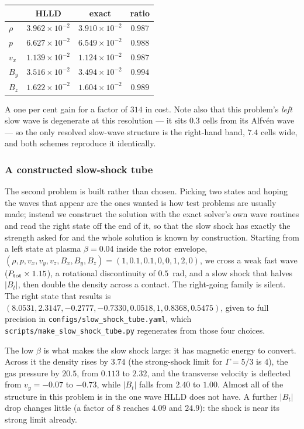 \begin{center}
\begin{tabular}{lccc}
\toprule
 & HLLD & exact & ratio \\
\midrule
$\rho$ & $3.962\times10^{-2}$ & $3.910\times10^{-2}$ & $0.987$ \\
$p$    & $6.627\times10^{-2}$ & $6.549\times10^{-2}$ & $0.988$ \\
$v_x$  & $1.139\times10^{-2}$ & $1.124\times10^{-2}$ & $0.987$ \\
$B_y$  & $3.516\times10^{-2}$ & $3.494\times10^{-2}$ & $0.994$ \\
$B_z$  & $1.622\times10^{-2}$ & $1.604\times10^{-2}$ & $0.989$ \\
\bottomrule
\end{tabular}
\end{center}

A one per cent gain for a factor of $314$ in cost. Note also that this
problem's \emph{left} slow wave is degenerate at this resolution --- it sits
$0.3$ cells from its Alfv\'en wave --- so the only resolved slow-wave
structure is the right-hand band, $7.4$ cells wide, and both schemes
reproduce it identically.

\subsubsection{A constructed slow-shock tube}
\label{sec:tests:slowshock}

The second problem is built rather than chosen. Picking two states and
hoping the waves that appear are the ones wanted is how test problems are
usually made; instead we construct the solution with the exact solver's own
wave routines and read the right state off the end of it, so that the slow
shock has exactly the strength asked for and the whole solution is known by
construction. Starting from a left state at plasma $\beta = 0.04$ inside the
rotor envelope, $(\rho, p, v_x, v_y, v_z, B_x, B_y, B_z) =
(1, 0.1, 0.1, 0, 0, 1, 2, 0)$, we cross a weak fast wave
($P_{\rm tot} \times 1.15$), a rotational discontinuity of $0.5$~rad, and a
slow shock that halves $|B_t|$, then double the density across a contact.
The right-going family is silent. The right state that results is
$(8.0531, 2.3147, -0.2777, -0.7330, 0.0518, 1, 0.8368, 0.5475)$, given to
full precision in \texttt{configs/slow\_shock\_tube.yaml}, which
\texttt{scripts/make\_slow\_shock\_tube.py} regenerates from those four
choices.

The low $\beta$ is what makes the slow shock large: it has magnetic energy
to convert. Across it the density rises by $3.74$ (the strong-shock limit
for $\Gamma = 5/3$ is $4$), the gas pressure by $20.5$, from $0.113$ to
$2.32$, and the transverse velocity is deflected from $v_y = -0.07$ to
$-0.73$, while $|B_t|$ falls from $2.40$ to $1.00$. Almost all of the
structure in this problem is in the one wave HLLD does not have. A further
$|B_t|$ drop changes little (a factor of $8$ reaches $4.09$ and $24.9$): the
shock is near its strong limit already.

